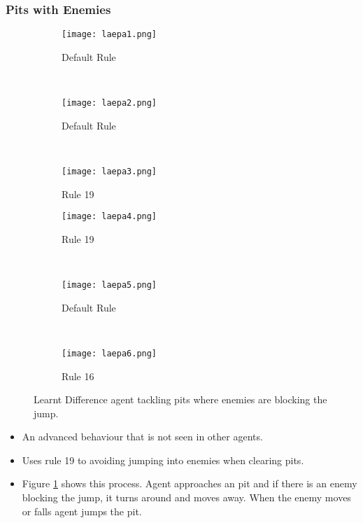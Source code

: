 \clearpage
\subsubsection*{\hspace{6pt}Pits with Enemies}

\begin{figure}[t]
	\begin{adjustwidth}{-2cm}{-2cm}
    \centering
          \begin{subfigure}[b]{0.328\textwidth}
                  \centering
                  \texttt{[image: laepa1.png]}
                  \caption{Default Rule}
          \end{subfigure}~
          \begin{subfigure}[b]{0.328\textwidth}
                  \centering
                  \texttt{[image: laepa2.png]}
                  \caption{Default Rule}
          \end{subfigure}~
          \begin{subfigure}[b]{0.328\textwidth}
                  \centering
                  \texttt{[image: laepa3.png]}
                  \caption{Rule 19}
          \end{subfigure}
          \begin{subfigure}[b]{0.328\textwidth}
                  \centering
                  \texttt{[image: laepa4.png]}
                  \caption{Rule 19}
          \end{subfigure}~
          \begin{subfigure}[b]{0.328\textwidth}
                  \centering
                  \texttt{[image: laepa5.png]}
                  \caption{Default Rule}
          \end{subfigure}~
          \begin{subfigure}[b]{0.328\textwidth}
                  \centering
                  \texttt{[image: laepa6.png]}
                  \caption{Rule 16}
          \end{subfigure}
    \caption{Learnt Difference agent tackling pits where enemies are blocking the jump.}\label{fig:laepa}
    \end{adjustwidth}
\end{figure}


\begin{itemize}
\item An advanced behaviour that is not seen in other agents.
\item Uses rule 19 to avoiding jumping into enemies when clearing pits.
\item Figure \ref{fig:laepa} shows this process. Agent approaches an pit and if there is an enemy blocking the jump, it turns around and moves away. When the enemy moves or falls agent jumps the pit.
\end{itemize}

